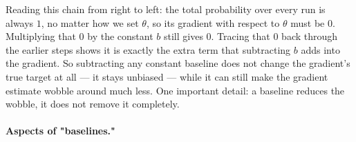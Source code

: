 \documentclass[11pt]{article}
\begin{document}
Reading this chain from right to left: the total probability over every run is always $1$, no matter how we set $\theta$, so its gradient with respect to $\theta$ must be $0$. Multiplying that $0$ by the constant $b$ still gives $0$. Tracing that $0$ back through the earlier steps shows it is exactly the extra term that subtracting $b$ adds into the gradient. So subtracting any constant baseline does not change the gradient's true target at all --- it stays unbiased --- while it can still make the gradient estimate wobble around much less. One important detail: a baseline reduces the wobble, it does not remove it completely.

\paragraph{Aspects of "baselines."}
\end{document}
